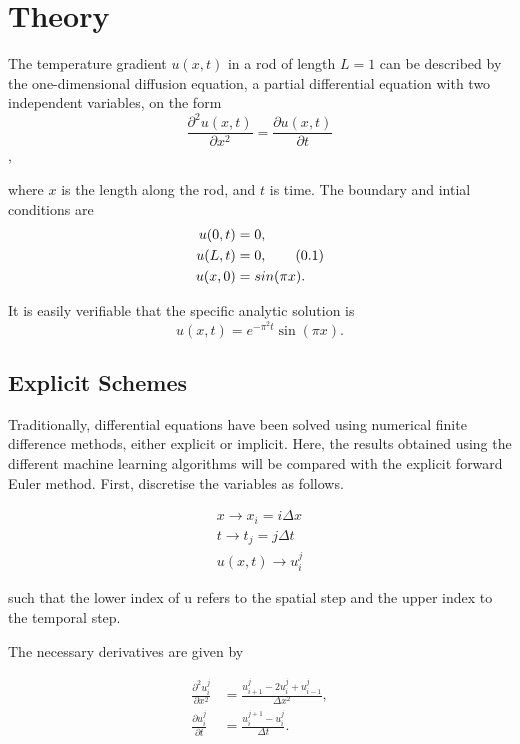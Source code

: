 \documentclass[multicolumn, 10pt]{extarticle}
\newcommand\numberthis{\addtocounter{equation}{1}\tag{\theequation}}
\begin{document}
\section{Theory}

The temperature gradient $u(x, t)$ in a rod of length $L=1$ can be described by the one-dimensional diffusion equation, a partial differential equation with two independent variables, on the form
\begin{equation}\label{eq:diff}
	\frac{\partial^2 u(x, t) }{\partial x^2} = \frac{\partial u(x, t)}{\partial t}
\end{equation},

where $x$ is the length along the rod, and $t$ is time. The boundary and intial conditions are
\begin{align*}\label{eq:boundary}
	u(0, t) & = 0,             \\
	u(L, t) & = 0, \numberthis \\
	u(x, 0) & = sin(\pi x).
\end{align*}

It is easily verifiable that the specific analytic solution is
\begin{equation}\label{eq:anal}
	u(x, t) = e^{-\pi^2t}\sin(\pi x).
\end{equation}

\subsection{Explicit Schemes}
Traditionally, differential equations have been solved using numerical finite difference methods, either explicit or implicit. Here, the results obtained using the different machine learning algorithms will be compared with the explicit forward Euler method. First, discretise the variables as follows.

\begin{align*}
	x \rightarrow x_{i} = i\Delta x  \\
	t \rightarrow t_{j} = j \Delta t \\
	u(x, t)  \rightarrow u_{i}^{j}
\end{align*}

such that the lower index of u refers to the spatial step and the upper index to the temporal step.

The necessary derivatives are given by

\begin{align*}
	\frac{\partial^2u_i^j}{\partial x^2} & = \frac{u_{i+1}^{j} - 2u_{i}^{j} + u_{i-1}^{j}}{\Delta x^{2}}, \\
	\frac{\partial u_i^j}{\partial t}    & = \frac{u_{i}^{j+1} - u_{i}^{j}}{\Delta t}.                    \\
\end{align*}
\end{document}
